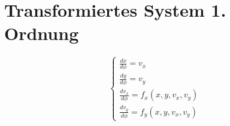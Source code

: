 \section{Transformiertes System 1. Ordnung}
\[
\begin{cases}
\frac{dx}{d\phi} = v_x \\
\frac{dy}{d\phi} = v_y \\
\frac{dv_x}{d\phi} = f_x(x,y,v_x,v_y) \\
\frac{dv_y}{d\phi} = f_y(x,y,v_x,v_y)
\end{cases}
\]